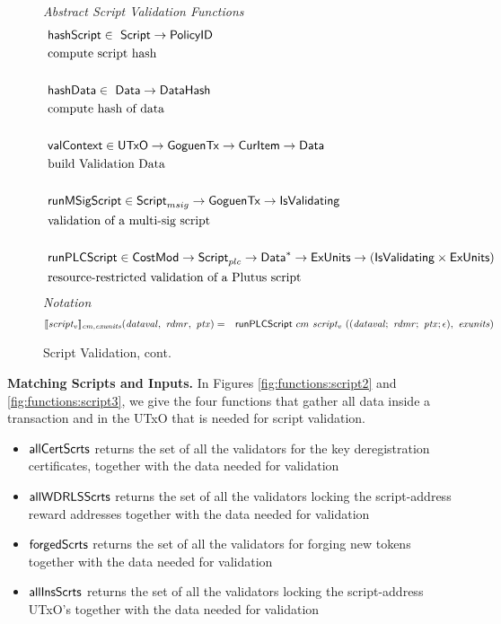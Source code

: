 \begin{figure*}[htb]
  \emph{Abstract Script Validation Functions}
  \begin{align*}
     &\mathsf{hashScript} \in  ~\mathsf{Script}\to \mathsf{PolicyID} \\
     &\text{compute script hash} \\~\\
     &\mathsf{hashData} \in  ~\mathsf{Data} \to \mathsf{DataHash} \\
     &\text{compute hash of data} \\~\\
     &\mathsf{valContext} \in  \mathsf{UTxO} \to \mathsf{GoguenTx} \to \mathsf{CurItem} \to \mathsf{Data} \\
     &\text{build Validation Data} \\~\\
     &\mathsf{runMSigScript} \in\mathsf{Script}_{msig}\to \mathsf{GoguenTx} \to \mathsf{IsValidating}  \\
     &\text{validation of a multi-sig script} \\~\\
     &\mathsf{runPLCScript} \in \mathsf{CostMod} \to\mathsf{Script}_{plc} \to
    \mathsf{Data}^{*} \to \mathsf{ExUnits} \to (\mathsf{IsValidating} \times \mathsf{ExUnits}) \\
     &\text{resource-restricted validation of a Plutus script}
  \end{align*}
  \emph{Notation}
  \begin{align*}
    \llbracket \mathit{script_v} \rrbracket_{\mathit{cm},\mathit{exunits}}(\mathit{dataval},~\mathit{rdmr},~\mathit{ptx})
    &=& \mathsf{runPLCScript} ~{cm}~\mathit{script_v}~((\mathit{dataval};~\mathit{rdmr};~\mathit{ptx};\epsilon),~
    \mathit{exunits})
  \end{align*}
  \caption{Script Validation, cont.}
  \label{fig:defs:functions-valid}
\end{figure*}

\textbf{Matching Scripts and Inputs.}
In Figures \ref{fig:functions:script2} and \ref{fig:functions:script3},
we give the four functions that gather all data inside a transaction
and in the UTxO that is needed for script validation.

\begin{itemize}
\item $\mathsf{allCertScrts}$ returns the set of all the validators for the
key deregistration certificates, together
with the data needed for validation
\item $\mathsf{allWDRLSScrts}$ returns the set of all the validators locking
the script-address reward addresses together
with the data needed for validation
\item $\mathsf{forgedScrts}$ returns the set of all the validators for
forging new tokens together
with the data needed for validation
\item $\mathsf{allInsScrts}$ returns the set of all the validators locking
the script-address UTxO's together
with the data needed for validation
\end{itemize}


